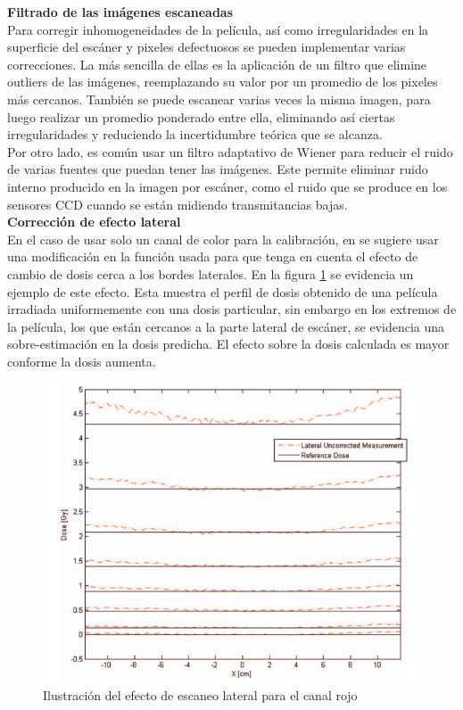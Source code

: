 \textbf{Filtrado de las imágenes escaneadas\cite{Devic2005}\cite{Li2017}}\\

Para corregir inhomogeneidades de la película, así como irregularidades en la superficie del escáner y pixeles defectuosos se pueden implementar varias correcciones. La más sencilla de ellas es la aplicación de un filtro que elimine outliers de las imágenes, reemplazando su valor por un promedio de los pixeles más cercanos. También se puede escanear varias veces la misma imagen, para luego realizar un promedio ponderado entre ella, eliminando así ciertas irregularidades y reduciendo la incertidumbre teórica que se alcanza.\\

Por otro lado, es común usar un filtro adaptativo de Wiener para reducir el ruido de varias fuentes que puedan tener las imágenes. Este permite eliminar ruido interno producido en la imagen por escáner, como el ruido que se produce en los sensores CCD cuando se están midiendo transmitancias bajas.\\

\textbf{Corrección de efecto lateral} \\

En el caso de usar solo un canal de color para la calibración, en \cite{Crijns2013} se sugiere usar una modificación en la función usada para que tenga en cuenta el efecto de cambio de dosis cerca a los bordes laterales. En la figura \ref{fig:efectoLateral} se evidencia  un ejemplo de este efecto. Esta muestra el perfil de dosis obtenido de una película irradiada uniformemente con una dosis particular, sin embargo en los extremos de la película, los que están cercanos a la parte lateral de escáner, se evidencia una sobre-estimación en la dosis predicha. El efecto sobre la dosis calculada es mayor conforme la dosis aumenta.\\

\begin{figure}[H]
	\centering
	\includegraphics[width=0.6\linewidth]{images/efectoLateral.png}
	\caption{Ilustración del efecto de escaneo lateral para el canal rojo \cite{Crijns2013}}
	\label{fig:efectoLateral}
\end{figure}

